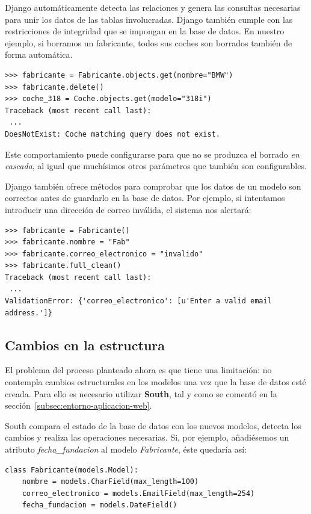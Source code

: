 Django automáticamente detecta las relaciones y genera las consultas necesarias
para unir los datos de las tablas involucradas. Django también cumple con las
restricciones de integridad que se impongan en la base de datos. En nuestro
ejemplo, si borramos un fabricante, todos sus coches son borrados también de
forma automática.

\begin{verbatim}
>>> fabricante = Fabricante.objects.get(nombre="BMW") 
>>> fabricante.delete()
>>> coche_318 = Coche.objects.get(modelo="318i")
Traceback (most recent call last):
 ...
DoesNotExist: Coche matching query does not exist.
\end{verbatim}

Este comportamiento puede configurarse para que no se produzca el borrado
\textit{en cascada}, al igual que muchísimos otros parámetros que también son
configurables.

Django también ofrece métodos para comprobar que los datos de un modelo son
correctos antes de guardarlo en la base de datos. Por ejemplo, si intentamos
introducir una dirección de correo inválida, el sistema nos alertará:

\begin{verbatim}
>>> fabricante = Fabricante()
>>> fabricante.nombre = "Fab"
>>> fabricante.correo_electronico = "invalido"
>>> fabricante.full_clean()
Traceback (most recent call last):
 ...
ValidationError: {'correo_electronico': [u'Enter a valid email address.']}
\end{verbatim}


\subsection{Cambios en la estructura}

El problema del proceso planteado ahora es que tiene una limitación: no contempla
cambios estructurales en los modelos una vez que la base de datos esté
creada. Para ello es necesario utilizar \textbf{South}, tal y como se comentó en
la sección~\ref{subsec:entorno-aplicacion-web}. 

South compara el estado de la base de datos con los nuevos modelos, detecta los
cambios y realiza las operaciones necesarias. Si, por ejemplo, añadiésemos un
atributo \textit{fecha\_fundacion} al modelo \textit{Fabricante}, éste quedaría
así:

\begin{verbatim}
class Fabricante(models.Model):
    nombre = models.CharField(max_length=100)
    correo_electronico = models.EmailField(max_length=254)
    fecha_fundacion = models.DateField()
  
\end{verbatim}

